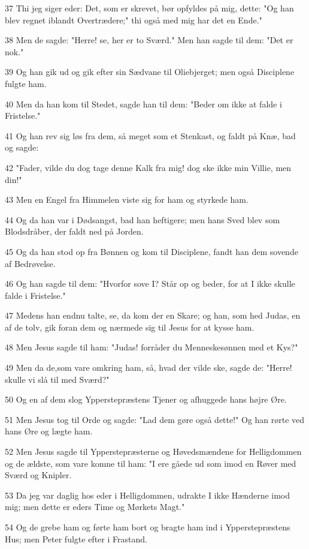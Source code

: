 \par 37 Thi jeg siger eder: Det, som er skrevet, bør opfyldes på mig, dette: "Og han blev regnet iblandt Overtrædere;" thi også med mig har det en Ende."
\par 38 Men de sagde: "Herre! se, her er to Sværd." Men han sagde til dem: "Det er nok."
\par 39 Og han gik ud og gik efter sin Sædvane til Oliebjerget; men også Disciplene fulgte ham.
\par 40 Men da han kom til Stedet, sagde han til dem: "Beder om ikke at falde i Fristelse."
\par 41 Og han rev sig løs fra dem, så meget som et Stenkast, og faldt på Knæ, bad og sagde:
\par 42 "Fader, vilde du dog tage denne Kalk fra mig! dog ske ikke min Villie, men din!"
\par 43 Men en Engel fra Himmelen viste sig for ham og styrkede ham.
\par 44 Og da han var i Dødsangst, bad han heftigere; men hans Sved blev som Blodsdråber, der faldt ned på Jorden.
\par 45 Og da han stod op fra Bønnen og kom til Disciplene, fandt han dem sovende af Bedrøvelse.
\par 46 Og han sagde til dem: "Hvorfor sove I? Står op og beder, for at I ikke skulle falde i Fristelse."
\par 47 Medens han endnu talte, se, da kom der en Skare; og han, som hed Judas, en af de tolv, gik foran dem og nærmede sig til Jesus for at kysse ham.
\par 48 Men Jesus sagde til ham: "Judas! forråder du Menneskesønnen med et Kys?"
\par 49 Men da de,som vare omkring ham, så, hvad der vilde ske, sagde de: "Herre! skulle vi slå til med Sværd?"
\par 50 Og en af dem slog Ypperstepræstens Tjener og afhuggede hans højre Øre.
\par 51 Men Jesus tog til Orde og sagde: "Lad dem gøre også dette!" Og han rørte ved hans Øre og lægte ham.
\par 52 Men Jesus sagde til Ypperstepræsterne og Høvedsmændene for Helligdommen og de ældste, som vare komne til ham: "I ere gåede ud som imod en Røver med Sværd og Knipler.
\par 53 Da jeg var daglig hos eder i Helligdommen, udrakte I ikke Hænderne imod mig; men dette er eders Time og Mørkets Magt."
\par 54 Og de grebe ham og førte ham bort og bragte ham ind i Ypperstepræstens Hus; men Peter fulgte efter i Frastand.
